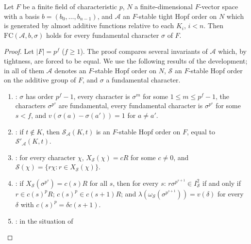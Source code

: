\begin{theorem}\label{pf:tower:flag}
Let $F$ be a finite field of characteristic $p$, $N$ a finite-dimensional $F$-vector space with a basis
$b=(b_0,\dots,b_{n-1})$, and $\mathcal A$ an $F$-stable tight Hopf order on $N$ which is generated by almost additive
functions relative to each $K_i$, $i<n$. Then $\mathrm{FC}(\mathcal A,b,\sigma)$ holds for every fundamental character
$\sigma$ of $F$.
\end{theorem}

\begin{proof}
Let $|F|=p^f$ ($f\ge1$). The proof compares several invariants of $\mathcal A$ which, by tightness, are forced to be
equal. We use the following results of the development; in all of them $\mathcal A$ denotes an $F$-stable Hopf order
on $N$, $\mathcal S$ an $F$-stable Hopf order on the additive group of $F$, and $\sigma$ a fundamental character.
\begin{enumerate}[label=(\roman*)]
\item\label{pf:tower:fl-teich} : $\sigma$ has order
  $p^f-1$, every character is $\sigma^m$ for some $1\le m\le p^f-1$, the characters $\sigma^{p^s}$ are fundamental, every
  fundamental character is $\sigma^{p^s}$ for some $s<f$, and $v(\sigma(a)-\sigma(a'))=1$ for $a\ne a'$.
\item\label{pf:tower:fl-trans} : if $t\notin K$, then
  $\mathcal S_{\mathcal A}(K,t)$ is an $F$-stable Hopf order on $F$, equal to $\mathcal S'_{\mathcal A}(K,t)$.
\item\label{pf:tower:fl-princ} : for every character $\chi$,
  $X_{\mathcal S}(\chi)=cR$ for some $c\ne0$, and $\mathcal S(\chi)=\{r\chi:r\in X_{\mathcal S}(\chi)\}$.
\item\label{pf:tower:fl-frob} : if
  $X_{\mathcal S}(\sigma^{p^s})=c(s)R$ for all $s$, then for every $s$: $r\sigma^{p^{s+1}}\in I_{\mathcal S}^2$ if and only if
  $r\in c(s)^pR$; $c(s)^p\in c(s+1)R$; and $\lambda(\omega_{\mathcal S}(\sigma^{p^{s+1}}))=v(\delta)$ for every $\delta$ with
  $c(s)^p=\delta c(s+1)$.
\item\label{pf:tower:fl-val} : in the situation of

\end{enumerate}
\end{proof}
